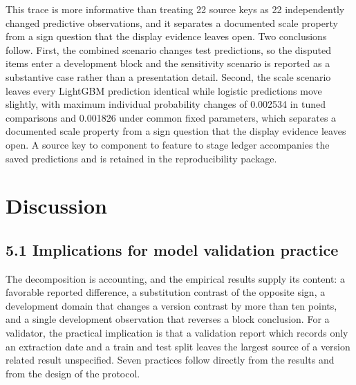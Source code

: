 \documentclass[10pt,a4paper,twocolumn]{article}
\begin{document}
This trace is more informative than treating 22 source keys as 22 independently changed predictive observations, and it separates a documented scale property from a sign question that the display evidence leaves open. Two conclusions follow. First, the combined scenario changes test predictions, so the disputed items enter a development block and the sensitivity scenario is reported as a substantive case rather than a presentation detail. Second, the scale scenario leaves every LightGBM prediction identical while logistic predictions move slightly, with maximum individual probability changes of 0.002534 in tuned comparisons and 0.001826 under common fixed parameters, which separates a documented scale property from a sign question that the display evidence leaves open. A source key to component to feature to stage ledger accompanies the saved predictions and is retained in the reproducibility package.
\section{Discussion}
\subsection{5.1 Implications for model validation practice}

The decomposition is accounting, and the empirical results supply its content: a favorable reported difference, a substitution contrast of the opposite sign, a development domain that changes a version contrast by more than ten points, and a single development observation that reverses a block conclusion. For a validator, the practical implication is that a validation report which records only an extraction date and a train and test split leaves the largest source of a version related result unspecified. Seven practices follow directly from the results and from the design of the protocol.
\end{document}
